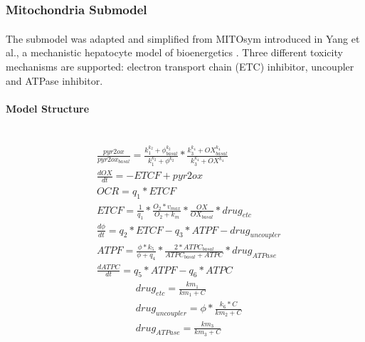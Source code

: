 \documentclass[12pt]{article}
\newcommand{\myparagraph}[1]{\paragraph{#1}\mbox{}\\}
\begin{document}
\subsubsection{Mitochondria Submodel} \label{section:mito}
The submodel was adapted and simplified from MITOsym\textsuperscript{\textregistered} introduced in Yang et al., a mechanistic hepatocyte model of bioenergetics  \cite{y.yangMITOsymMechanisticMathematical2015}. Three different toxicity mechanisms are supported: electron transport chain (ETC) inhibitor, uncoupler and ATPase inhibitor.
\myparagraph{Model Structure}
\begin{equation}
\label{eq:1}
\begin{aligned}
&\frac{pyr2ox}{pyr2ox_{basal}}=\frac{k_1^{k_2}+\phi_{basal}^{k_2}}{k_1^{k_2}+\phi^{k_2}}*\frac{k_3^{k_4}+OX_{basal}^{k_4}}{k_3^{k_4}+OX^{k_4}}\\
&\frac{dOX}{dt}=-ETCF+pyr2ox\\
& OCR=q_1*ETCF\\
& ETCF=\frac{1}{q_1}*\frac{O_2*v_{max}}{O_2+k_m}*\frac{OX}{OX_{basal}}*drug_{etc}\\
&\frac{d\phi}{dt}=q_2*ETCF-q_3*ATPF-drug_{uncoupler} \\
&ATPF=\frac{\phi*k_5}{\phi+q_4}*\frac{2*ATPC_{basal}}{ATPC_{basal}+ATPC}*drug_{ATPase}\\
&\frac{dATPC}{dt}=q_5*ATPF-q_6*ATPC 
\end{aligned} \end{equation}
\begin{equation}
\label{eq:2}
\begin{aligned}
& drug_{etc}=\frac{{km}_1}{{km}_1+C}\\
& drug_{uncoupler}=\phi*\frac{k_6*C}{{km}_2+C}\\& drug_{ATPase}=\frac{{km}_3}{{km}_3+C}\end{aligned} \end{equation}
\end{document}
